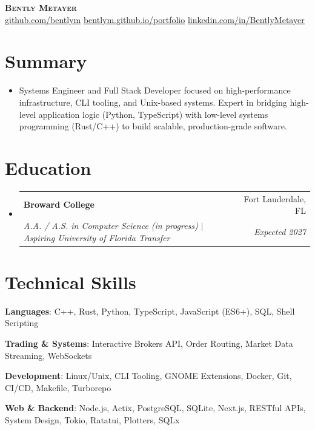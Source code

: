 \documentclass[letterpaper,11pt]{article}
\makeatletter
\newcommand{\resumeSubheading}[4]{
  \vspace{-2pt}\item
    \begin{tabular*}{0.97\textwidth}[t]{l@{\extracolsep{\fill}}r}
      \textbf{#1} & #2 \\
      \textit{\small #3} & \textit{\small #4} \\
    \end{tabular*}\vspace{-7pt}
}
\newcommand{\resumeSubHeadingListStart}{\begin{itemize}[leftmargin=0.15in, label={}]}
\newcommand{\resumeSubHeadingListEnd}{\end{itemize}}
\makeatother
\begin{document}
\begin{center}
    \textbf{\Huge \scshape Bently Metayer} \\
    \small 
     \href{https://github.com/bentlym}{\underline{github.com/bentlym}} 
         \href{https://bentlym.github.io/portfolio/}{\underline{bentlym.github.io/portfolio}} \quad{} \href{https://www.linkedin.com/in/BentleyMetayer}{\underline{linkedin.com/in/BentlyMetayer}} \quad
    \end{center}

\section{Summary}
\resumeSubHeadingListStart
    \item{
        Systems Engineer and Full Stack Developer focused on high-performance infrastructure, CLI tooling, and Unix-based systems. Expert in bridging high-level application logic (Python, TypeScript) with low-level systems programming (Rust/C++) to build scalable, production-grade software.
    }
\resumeSubHeadingListEnd

\section{Education}
  \resumeSubHeadingListStart
    \resumeSubheading
      {Broward College}{Fort Lauderdale, FL}
      {A.A. / A.S. in Computer Science (in progress) $|$ \emph{Aspiring University of Florida Transfer}}{Expected 2027}
  \resumeSubHeadingListEnd

\section{Technical Skills}
 \begin{itemize}[leftmargin=0.15in, label={}]
    \small{
     \item \textbf{Languages}{: C++, Rust, Python, TypeScript, JavaScript (ES6+), SQL, Shell Scripting}
     \item \textbf{Trading \& Systems}{: Interactive Brokers API, Order Routing, Market Data Streaming, WebSockets}
     \item \textbf{Development}{: Linux/Unix, CLI Tooling, GNOME Extensions, Docker, Git, CI/CD, Makefile, Turborepo}
     \item \textbf{Web \& Backend}{: Node.js, Actix, PostgreSQL, SQLite, Next.js, RESTful APIs, System Design, Tokio, Ratatui, Plotters, SQLx}
    }
 \end{itemize}
\end{document}
